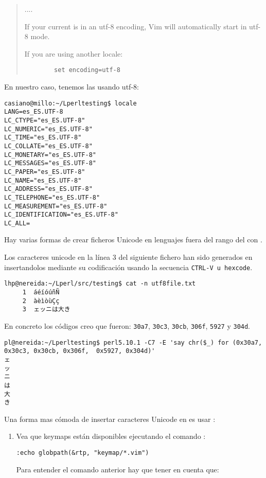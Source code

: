 \begin{htmlonly}
\begin{htmlonly}
\begin{it}
\begin{quote}
....

If your current  is in an utf-8 encoding, Vim will automatically start
in utf-8 mode.

If you are using another locale:

\begin{verbatim}
        set encoding=utf-8
\end{verbatim}

\end{quote}
\end{it}
En nuestro caso, tenemos las  usando utf-8:
\begin{verbatim}
casiano@millo:~/Lperltesting$ locale
LANG=es_ES.UTF-8
LC_CTYPE="es_ES.UTF-8"
LC_NUMERIC="es_ES.UTF-8"
LC_TIME="es_ES.UTF-8"
LC_COLLATE="es_ES.UTF-8"
LC_MONETARY="es_ES.UTF-8"
LC_MESSAGES="es_ES.UTF-8"
LC_PAPER="es_ES.UTF-8"
LC_NAME="es_ES.UTF-8"
LC_ADDRESS="es_ES.UTF-8"
LC_TELEPHONE="es_ES.UTF-8"
LC_MEASUREMENT="es_ES.UTF-8"
LC_IDENTIFICATION="es_ES.UTF-8"
LC_ALL=
\end{verbatim}

Hay varias formas de crear ficheros Unicode en lenguajes 
fuera del rango del  con \vim{}.

Los caracteres unicode en la línea 3 del siguiente fichero
han sido generados en  insertandolos
mediante su codificación usando la secuencia \verb|CTRL-V u hexcode|. 
\begin{verbatim}
lhp@nereida:~/Lperl/src/testing$ cat -n utf8file.txt
     1  áéíóúñÑ
     2  àèìòùÇç
     3  ェッニは大き
\end{verbatim}
En concreto los códigos creo que fueron: \verb|30a7|, \verb|30c3|, \verb|30cb|, \verb|306f|, \verb|5927| y \verb|304d|.
\begin{verbatim}
pl@nereida:~/Lperltesting$ perl5.10.1 -C7 -E 'say chr($_) for (0x30a7, 0x30c3, 0x30cb, 0x306f,  0x5927, 0x304d)'
ェ
ッ
ニ
は
大
き
\end{verbatim}
Una forma mas cómoda de insertar caracteres Unicode en \vim{} es usar 
:
\begin{enumerate}
\item
Vea que keymaps están disponibles ejecutando el comando \vim{}:

\begin{verbatim}
:echo globpath(&rtp, "keymap/*.vim")
\end{verbatim}
Para entender el comando anterior hay que tener en cuenta que:


\end{enumerate}
\end{htmlonly}
\end{htmlonly}
